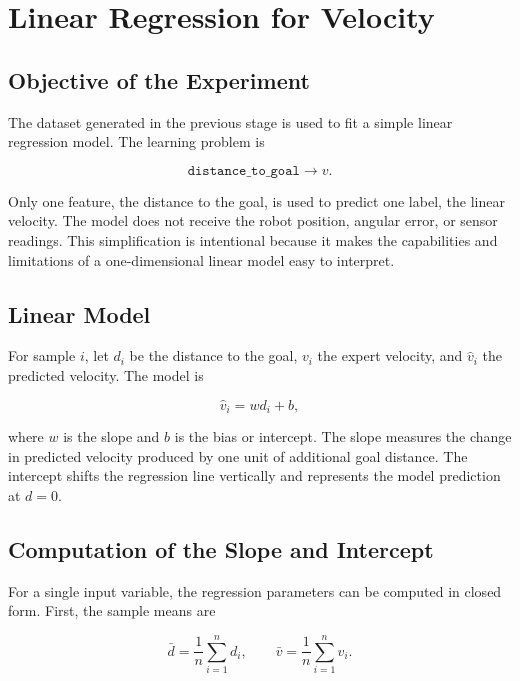 \documentclass[10pt,twocolumn,a4paper]{article}
\begin{document}
\section{Linear Regression for Velocity}

\subsection{Objective of the Experiment}

The dataset generated in the previous stage is used to fit a simple linear
regression model. The learning problem is

\[
    \texttt{distance\_to\_goal}
    \longrightarrow
    v.
\]

Only one feature, the distance to the goal, is used to predict one label, the
linear velocity. The model does not receive the robot position, angular error,
or sensor readings. This simplification is intentional because it makes the
capabilities and limitations of a one-dimensional linear model easy to
interpret.

\subsection{Linear Model}

For sample $i$, let $d_i$ be the distance to the goal, $v_i$ the expert
velocity, and $\hat{v}_i$ the predicted velocity. The model is

\begin{equation}
    \hat{v}_i = w d_i + b,
    \label{eq:linear_model}
\end{equation}

where $w$ is the slope and $b$ is the bias or intercept. The slope measures
the change in predicted velocity produced by one unit of additional goal
distance. The intercept shifts the regression line vertically and represents
the model prediction at $d=0$.

\subsection{Computation of the Slope and Intercept}

For a single input variable, the regression parameters can be computed in
closed form. First, the sample means are

\begin{equation}
    \bar{d}
    =
    \frac{1}{n}\sum_{i=1}^{n}d_i,
    \qquad
    \bar{v}
    =
    \frac{1}{n}\sum_{i=1}^{n}v_i.
    \label{eq:means}
\end{equation}
\end{document}
